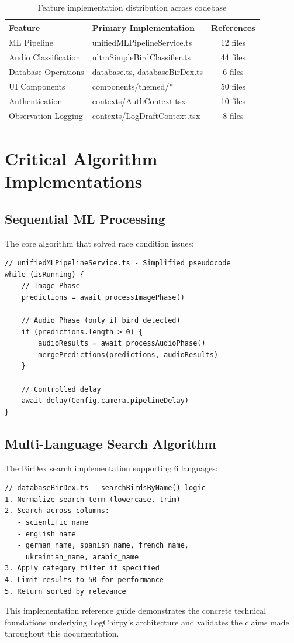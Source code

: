 \begin{table}[H]
\centering
\begin{tabular}{|l|l|c|}
\hline
\textbf{Feature} & \textbf{Primary Implementation} & \textbf{References} \\
\hline
ML Pipeline & unifiedMLPipelineService.ts & 12 files \\
Audio Classification & ultraSimpleBirdClassifier.ts & 44 files \\
Database Operations & database.ts, databaseBirDex.ts & 6 files \\
UI Components & components/themed/* & 50 files \\
Authentication & contexts/AuthContext.tsx & 10 files \\
Observation Logging & contexts/LogDraftContext.tsx & 8 files \\
\hline
\end{tabular}
\caption{Feature implementation distribution across codebase}
\end{table}

\section{Critical Algorithm Implementations}

\subsection{Sequential ML Processing}

The core algorithm that solved race condition issues:

\begin{verbatim}
// unifiedMLPipelineService.ts - Simplified pseudocode
while (isRunning) {
    // Image Phase
    predictions = await processImagePhase()
    
    // Audio Phase (only if bird detected)
    if (predictions.length > 0) {
        audioResults = await processAudioPhase()
        mergePredictions(predictions, audioResults)
    }
    
    // Controlled delay
    await delay(Config.camera.pipelineDelay)
}
\end{verbatim}

\subsection{Multi-Language Search Algorithm}

The BirDex search implementation supporting 6 languages:

\begin{verbatim}
// databaseBirDex.ts - searchBirdsByName() logic
1. Normalize search term (lowercase, trim)
2. Search across columns:
   - scientific_name
   - english_name
   - german_name, spanish_name, french_name, 
     ukrainian_name, arabic_name
3. Apply category filter if specified
4. Limit results to 50 for performance
5. Return sorted by relevance
\end{verbatim}

This implementation reference guide demonstrates the concrete technical foundations underlying LogChirpy's architecture and validates the claims made throughout this documentation.